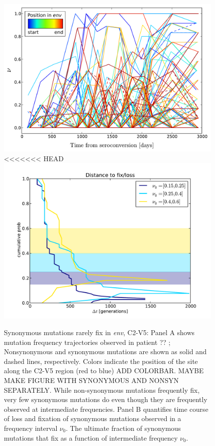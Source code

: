 \documentclass[rmp, twocolumn]{revtex4}
\newcommand{\env}{\textit{env}}
\begin{document}
\begin{figure}
\begin{center}
\includegraphics[width=\linewidth]{Shankarappa_allele_freqs_trajectories_syn_nonsynp8}
<<<<<<< HEAD
\includegraphics[width=\linewidth]{Shankarappa_fix_loss_dt_times}
\caption{Synonymous mutations rarely fix in \env, C2-V5: Panel A shows mutation 
frequency trajectories observed in patient ?? \cite{shankarappa_consistent_1999};  Nonsynonymous
and synonymous mutations are shown as solid and dashed lines, respectively. 
Colors indicate the position of the site along the C2-V5 region (red to blue) ADD COLORBAR. MAYBE MAKE FIGURE WITH SYNONYMOUS AND NONSYN SEPARATELY.
While non-synonymous mutations frequently fix, very few synonymous mutations do even though they are frequently observed at intermediate frequencies. Panel B quantifies time course of loss and fixation of synonymous mutations observed in a frequency interval $\nu_0$. The ultimate fraction of synonymous mutations that fix as a function of intermediate frequency $\nu_0$.
}
\end{center}
\end{figure}
\end{document}
